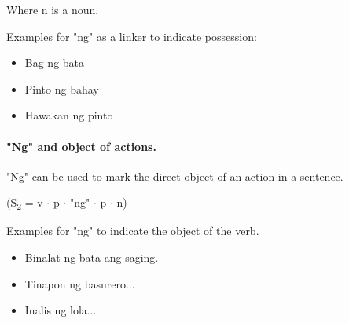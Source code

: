 Where n is a noun. \\

\begin{example}
      Examples for "ng" as a linker to indicate possession:
\end{example}
\begin{itemize}
      \item Bag ng bata
      \item Pinto ng bahay
      \item Hawakan ng pinto
\end{itemize}

\paragraph{"Ng" and object of actions.}"Ng" can be used to mark the direct object
of an action in a sentence.
\begin{center}
      (S\textsubscript{2} = v \(\cdot\) p \(\cdot\) "ng" \(\cdot\) p \(\cdot\) n)
\end{center}

\begin{example}
      Examples for "ng" to indicate the object of the verb.
\end{example}
\begin{itemize}
      \item Binalat ng bata ang saging.
      \item Tinapon ng basurero...
      \item Inalis ng lola...
\end{itemize}

